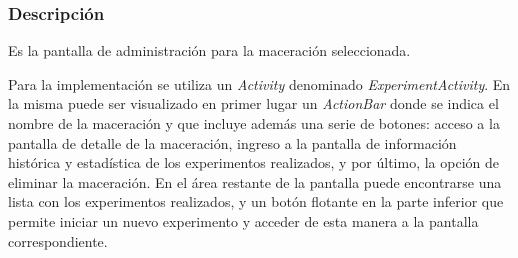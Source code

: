             \subsubsection{Descripción}
                \par Es la pantalla de administración para la maceración seleccionada.
                \par Para la implementación se utiliza un \textit{Activity} denominado \textit{ExperimentActivity}. En la misma puede ser visualizado en primer lugar un \textit{ActionBar} donde se indica el nombre de la maceración y que incluye además una serie de botones: acceso a la pantalla de detalle de la maceración, ingreso a la pantalla de información histórica y estadística de los experimentos realizados, y por último, la opción de eliminar la maceración. En el área restante de la pantalla puede encontrarse una lista con los experimentos realizados, y un botón flotante en la parte inferior que permite iniciar un nuevo experimento y acceder de esta manera a la pantalla correspondiente.
                
                
